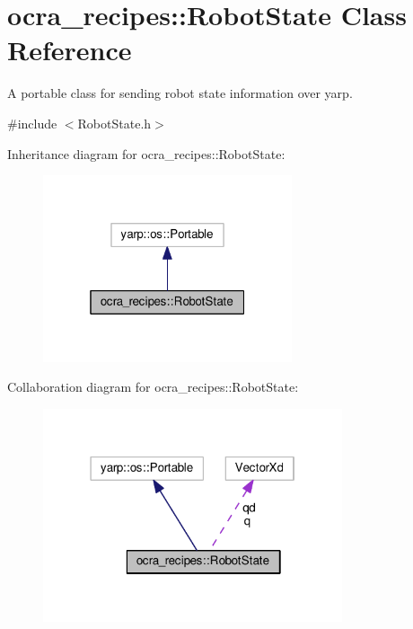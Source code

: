 \hypertarget{classocra__recipes_1_1RobotState}{}\section{ocra\+\_\+recipes\+:\+:Robot\+State Class Reference}
\label{classocra__recipes_1_1RobotState}


A portable class for sending robot state information over yarp.  




{\ttfamily \#include $<$Robot\+State.\+h$>$}



Inheritance diagram for ocra\+\_\+recipes\+:\+:Robot\+State\+:
\nopagebreak
\begin{figure}[H]
\begin{center}
\leavevmode
\includegraphics[width=208pt]{da/d8b/classocra__recipes_1_1RobotState__inherit__graph}
\end{center}
\end{figure}


Collaboration diagram for ocra\+\_\+recipes\+:\+:Robot\+State\+:
\nopagebreak
\begin{figure}[H]
\begin{center}
\leavevmode
\includegraphics[width=250pt]{d1/dc6/classocra__recipes_1_1RobotState__coll__graph}
\end{center}
\end{figure}
